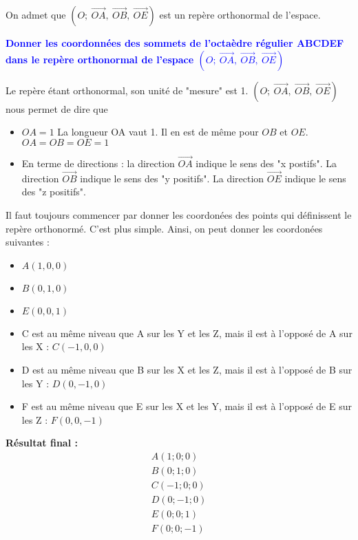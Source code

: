\documentclass{exam}
\begin{document}
On admet que $\left(O\mathpunct{} ; \ \overrightarrow{OA}\mathpunct{}, \ \overrightarrow{OB}\mathpunct{}, \ \overrightarrow{OE}\right)$ est un repère orthonormal de l'espace.
\begin{questions}
  \question[2.25] \textbf{\textcolor{blue}{Donner les coordonnées des sommets de l'octaèdre régulier ABCDEF dans le repère orthonormal de l'espace $\left(O\mathpunct{} ; \ \overrightarrow{OA}\mathpunct{}, \ \overrightarrow{OB}\mathpunct{}, \ \overrightarrow{OE}\right)$}}

  Le repère étant orthonormal, son unité de "mesure" est 1. $\left(O\mathpunct{} ; \ \overrightarrow{OA}\mathpunct{}, \ \overrightarrow{OB}\mathpunct{}, \ \overrightarrow{OE}\right)$ nous permet de dire que 
  \begin{itemize}
    \item $OA = 1$ La longueur OA vaut 1. Il en est de même pour $OB$ et $OE$. $OA = OB = OE = 1$
    \item En terme de directions : la direction $\overrightarrow{OA}$ indique le sens des "x postifs". La direction $\overrightarrow{OB}$ indique le sens des "y positifs". La direction $\overrightarrow{OE}$ indique le sens des "z positifs".
  \end{itemize}

  Il faut toujours commencer par donner les coordonées des points qui définissent le repère orthonormé. C'est plus simple. Ainsi, on peut donner les coordonées suivantes : 
  \begin{itemize}
    \item $A(1,0,0)$
    \item $B(0,1,0)$
    \item $E(0,0,1)$
    \item C est au même niveau que A sur les Y et les Z, mais il est à l'opposé de A sur les X : $C(-1,0,0)$
    \item D est au même niveau que B sur les X et les Z, mais il est à l'opposé de B sur les Y : $D(0,-1,0)$
    \item F est au même niveau que E sur les X et les Y, mais il est à l'opposé de E sur les Z : $F(0,0,-1)$
  \end{itemize}


  \textbf{Résultat final :} 
\begin{align*}
  A(1; 0; 0) \\
  B(0; 1; 0) \\
  C(-1; 0; 0) \\
  D(0; -1; 0) \\
  E(0; 0; 1) \\
  F(0; 0; -1)
\end{align*} 


\end{questions}
\end{document}
